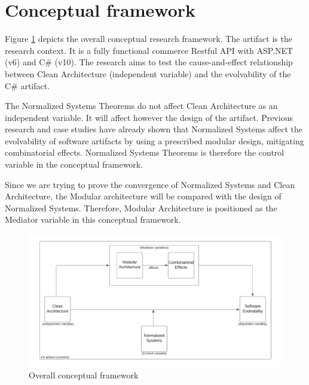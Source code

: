 \newpage
\section{Conceptual framework} 
\label{conceptualframework}

Figure \ref{fig_conceptual_framework} depicts the overall conceptual research framework.
The artifact is the research context. It is a fully functional commerce Restful API with
ASP.NET (v6) and C\# (v10). The research aims to test the cause-and-effect relationship
between Clean Architecture (independent variable) and the evolvability of the C\#
artifact.

The Normalized Systems Theorems do not affect Clean Architecture as an independent
variable. It will affect however the design of the artifact. Previous research and case
studies have already shown that Normalized Systems affect the evolvability of software
artifacts by using a prescribed modular design, mitigating combinatorial effects.
Normalized Systems Theorems is therefore the control variable in the conceptual framework.

Since we are trying to prove the convergence of Normalized Systems and Clean
Architecture, the Modular architecture will be compared with the design of Normalized
Systems. Therefore, Modular Architecture is positioned as the Mediator variable in this
conceptual framework.

\begin{figure}[!ht]
    \centering
    \includegraphics[width=1\textwidth]{Figures/conceptual_framework}
    \caption[Overall conceptual framework]{Overall conceptual framework}
    \label{fig_conceptual_framework}
\end{figure}
